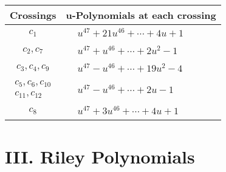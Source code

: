 \documentclass[1p]{elsarticle_modified}
\theoremstyle{definition}
\begin{document}
\begin{tabular}{m{50pt}|m{274pt}}
Crossings & \hspace{64pt}u-Polynomials at each crossing \\
\hline $$\begin{aligned}c_{1}\end{aligned}$$&$\begin{aligned}
&u^{47}+21 u^{46}+\cdots+4 u+1
\end{aligned}$\\
\hline $$\begin{aligned}c_{2},c_{7}\end{aligned}$$&$\begin{aligned}
&u^{47}+u^{46}+\cdots+2 u^2-1
\end{aligned}$\\
\hline $$\begin{aligned}c_{3},c_{4},c_{9}\end{aligned}$$&$\begin{aligned}
&u^{47}- u^{46}+\cdots+19 u^2-4
\end{aligned}$\\
\hline $$\begin{aligned}c_{5},c_{6},c_{10}\\c_{11},c_{12}\end{aligned}$$&$\begin{aligned}
&u^{47}- u^{46}+\cdots+2 u-1
\end{aligned}$\\
\hline $$\begin{aligned}c_{8}\end{aligned}$$&$\begin{aligned}
&u^{47}+3 u^{46}+\cdots+4 u+1
\end{aligned}$\\
\hline
\end{tabular}\newpage\renewcommand{\arraystretch}{1}
\centering \section*{ III. Riley Polynomials}
\end{document}
